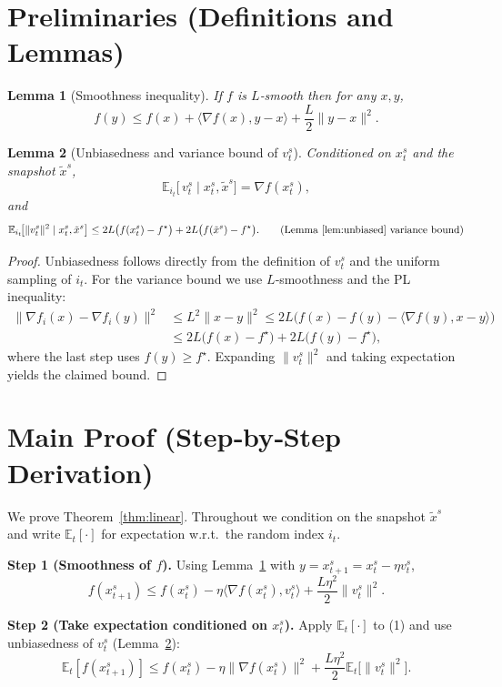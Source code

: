 \documentclass{article}
\newtheorem{lemma}{Lemma}
\begin{document}
\section*{Preliminaries (Definitions and Lemmas)}
\begin{lemma}[Smoothness inequality]\label{lem:smooth}
If $f$ is $L$‑smooth then for any $x,y$,
\[
f(y)\le f(x)+\langle\nabla f(x),y-x\rangle+\frac{L}{2}\|y-x\|^{2}.
\]
\end{lemma}
\begin{lemma}[Unbiasedness and variance bound of $v_{t}^{s}$]\label{lem:unbiased}
Conditioned on $x_{t}^{s}$ and the snapshot $\tilde{x}^{s}$,
\[
\mathbb{E}_{i_t}\!\bigl[\,v_{t}^{s}\mid x_{t}^{s},\tilde{x}^{s}\bigr]=\nabla f(x_{t}^{s}),
\]
and
\[
\mathbb{E}_{i_t}\!\bigl[\|v_{t}^{s}\|^{2}\mid x_{t}^{s},\tilde{x}^{s}\bigr]
\le 2L\bigl(f(x_{t}^{s})-f^{\star}\bigr)+2L\bigl(f(\tilde{x}^{s})-f^{\star}\bigr).
\tag{Lemma~\ref{lem:unbiased} variance bound}
\]
\end{lemma}
\begin{proof}
Unbiasedness follows directly from the definition of $v_{t}^{s}$ and the uniform sampling of $i_t$.  
For the variance bound we use $L$‑smoothness and the PL inequality:
\[
\begin{aligned}
\| \nabla f_i(x)-\nabla f_i(y)\|^{2}
&\le L^{2}\|x-y\|^{2}
\le 2L\bigl(f(x)-f(y)-\langle\nabla f(y),x-y\rangle\bigr)\\
&\le 2L\bigl(f(x)-f^{\star}\bigr)+2L\bigl(f(y)-f^{\star}\bigr),
\end{aligned}
\]
where the last step uses $f(y)\ge f^{\star}$. Expanding $\|v_{t}^{s}\|^{2}$ and taking expectation yields the claimed bound. \qedhere
\end{proof}

\section*{Main Proof (Step‑by‑Step Derivation)}
We prove Theorem~\ref{thm:linear}.  Throughout we condition on the snapshot $\tilde{x}^{s}$ and write $\mathbb{E}_{t}[\cdot]$ for expectation w.r.t.\ the random index $i_t$.

\noindent\textbf{Step 1 (Smoothness of $f$).}  
Using Lemma~\ref{lem:smooth} with $y=x_{t+1}^{s}=x_{t}^{s}-\eta v_{t}^{s}$,
\[
f(x_{t+1}^{s})\le f(x_{t}^{s})-\eta\langle\nabla f(x_{t}^{s}),v_{t}^{s}\rangle
+\frac{L\eta^{2}}{2}\|v_{t}^{s}\|^{2}.
\tag{1}
\]

\noindent\textbf{Step 2 (Take expectation conditioned on $x_{t}^{s}$).}  
Apply $\mathbb{E}_{t}[\cdot]$ to (1) and use unbiasedness of $v_{t}^{s}$ (Lemma~\ref{lem:unbiased}):
\[
\mathbb{E}_{t}[f(x_{t+1}^{s})]
\le f(x_{t}^{s})-\eta\|\nabla f(x_{t}^{s})\|^{2}
+\frac{L\eta^{2}}{2}\mathbb{E}_{t}\!\bigl[\|v_{t}^{s}\|^{2}\bigr].
\tag{2}
\]
\end{document}
